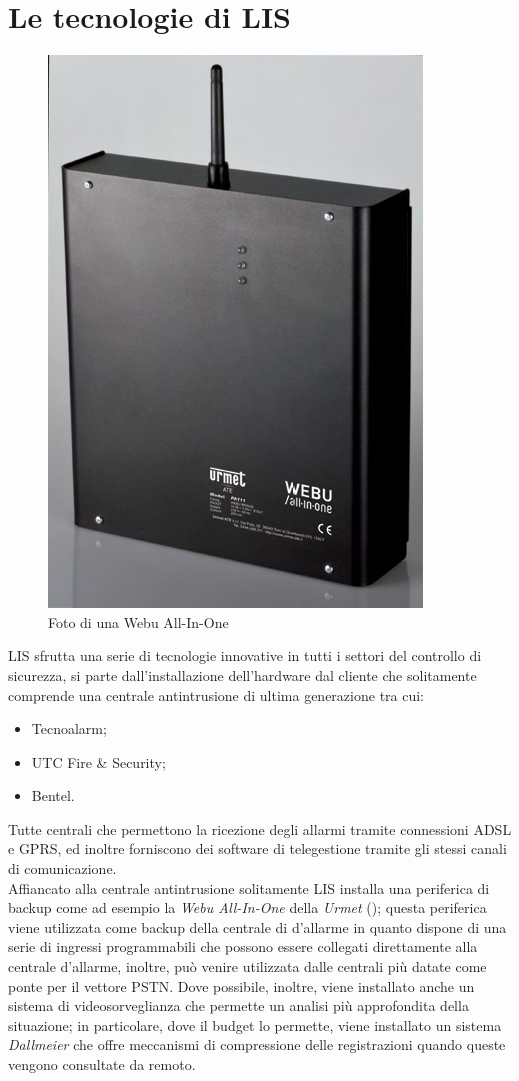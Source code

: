 \section{Le tecnologie di LIS}
\begin{figure}
	\centering
	\includegraphics[width= 0.4\linewidth]{pictures/webuall.jpg}
	\caption{Foto di una Webu All-In-One}\label{fig:webuall}
\end{figure}
LIS sfrutta una serie di tecnologie innovative in tutti i settori del controllo di sicurezza, si parte dall'installazione dell'hardware dal cliente che solitamente comprende una centrale antintrusione di ultima generazione tra cui:
\begin{itemize}
	\item Tecnoalarm;
	\item UTC Fire \& Security;
	\item Bentel.
\end{itemize}
Tutte centrali che permettono la ricezione degli allarmi tramite connessioni ADSL e GPRS, ed inoltre forniscono dei software di telegestione tramite gli stessi canali di comunicazione.\\
Affiancato alla centrale antintrusione solitamente LIS installa una periferica di backup come ad esempio la \emph{Webu All-In-One} della \emph{Urmet} (); questa periferica viene utilizzata come backup della centrale di d'allarme in quanto dispone di una serie di ingressi programmabili che possono essere collegati direttamente alla centrale d'allarme, inoltre, può venire utilizzata  dalle centrali più datate come ponte per il vettore PSTN. Dove possibile, inoltre, viene installato anche un sistema di videosorveglianza che permette un analisi più approfondita della situazione; in particolare, dove il budget lo permette, viene installato un sistema \emph{Dallmeier} che offre meccanismi di compressione delle registrazioni quando queste vengono consultate da remoto\cite{dallmeier:premote}.\\
